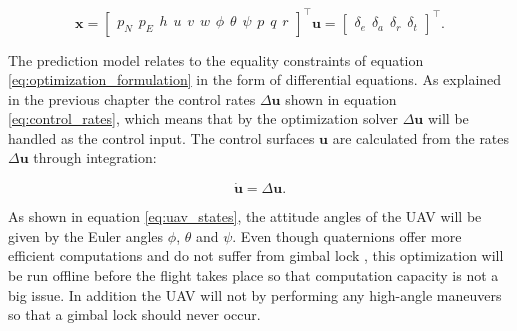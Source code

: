 \begin{subequations}
\begin{equation}
	\label{eq:uav_states}
	\mathbf{x} =
	\begin{bmatrix}
		p_N \hspace{5pt} p_E \hspace{5pt} h \hspace{5pt}
		u \hspace{5pt} v \hspace{5pt} w \hspace{5pt}
		\phi \hspace{5pt} \theta \hspace{5pt} \psi \hspace{5pt}
		p \hspace{5pt} q \hspace{5pt} r
	\end{bmatrix}^\intercal
\end{equation}
\begin{equation}
	\mathbf{u} =
	\begin{bmatrix}
		\delta_e \hspace{5pt} \delta_a \hspace{5pt} \delta_r \hspace{5pt} \delta_t
	\end{bmatrix}^\intercal.
\end{equation}
\end{subequations}

The prediction model relates to the equality constraints of equation \ref{eq:optimization_formulation} in the form of differential equations. As explained in the previous chapter the control rates $\Delta\mathbf{u}$ shown in equation \ref{eq:control_rates}, which means that by the optimization solver $\Delta\mathbf{u}$ will be handled as the control input. The control surfaces $\mathbf{u}$ are calculated from the rates $\Delta\mathbf{u}$ through integration:

\begin{equation}
	\mathbf{\dot{u}} = \Delta\mathbf{u}.
\end{equation}

As shown in equation \ref{eq:uav_states}, the attitude angles of the UAV will be given by the Euler angles $\phi$, $\theta$ and $\psi$. Even though quaternions offer more efficient computations and do not suffer from gimbal lock \cite{uavBEARD}, this optimization will be run offline before the flight takes place so that computation capacity is not a big issue. In addition the UAV will not by performing any high-angle maneuvers so that a gimbal lock should never occur.


